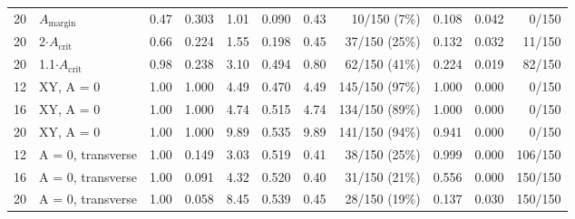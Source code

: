 \documentclass{ieeeaccess}
\begin{document}
\begin{table}[!t]
\begin{tabular}{rlrrrrrrrrr}
20 & $A_{\mathrm{margin}}$ & 0.47 & 0.303 & 1.01 & 0.090 & 0.43 & 10/150 (7\%) & 0.108 & 0.042 & 0/150 \\
20 & 2$\cdot$$A_{\mathrm{crit}}$ & 0.66 & 0.224 & 1.55 & 0.198 & 0.45 & 37/150 (25\%) & 0.132 & 0.032 & 11/150 \\
20 & 1.1$\cdot$$A_{\mathrm{crit}}$ & 0.98 & 0.238 & 3.10 & 0.494 & 0.80 & 62/150 (41\%) & 0.224 & 0.019 & 82/150 \\
12 & XY, A = 0 & 1.00 & 1.000 & 4.49 & 0.470 & 4.49 & 145/150 (97\%) & 1.000 & 0.000 & 0/150 \\
16 & XY, A = 0 & 1.00 & 1.000 & 4.74 & 0.515 & 4.74 & 134/150 (89\%) & 1.000 & 0.000 & 0/150 \\
20 & XY, A = 0 & 1.00 & 1.000 & 9.89 & 0.535 & 9.89 & 141/150 (94\%) & 0.941 & 0.000 & 0/150 \\
12 & A = 0, transverse & 1.00 & 0.149 & 3.03 & 0.519 & 0.41 & 38/150 (25\%) & 0.999 & 0.000 & 106/150 \\
16 & A = 0, transverse & 1.00 & 0.091 & 4.32 & 0.520 & 0.40 & 31/150 (21\%) & 0.556 & 0.000 & 150/150 \\
20 & A = 0, transverse & 1.00 & 0.058 & 8.45 & 0.539 & 0.45 & 28/150 (19\%) & 0.137 & 0.030 & 150/150 \\
\bottomrule
\end{tabular}
\end{table}
\end{document}
